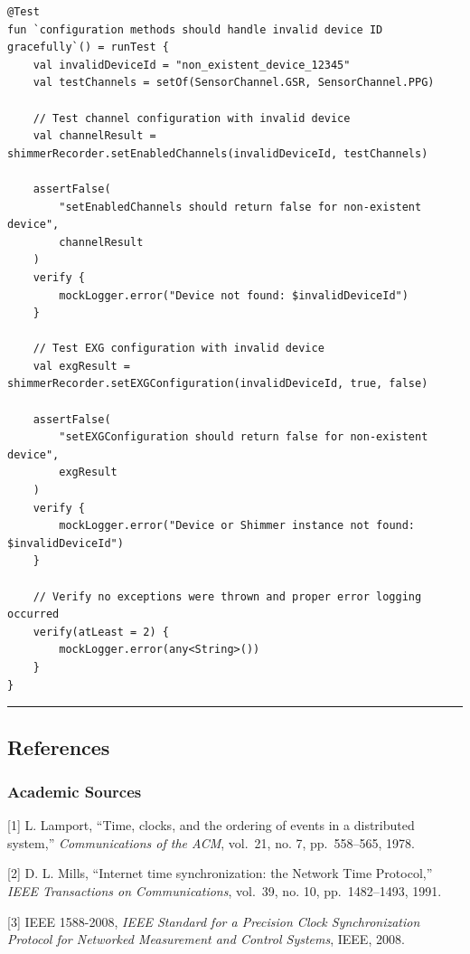 \documentclass[12pt,a4paper]{article}
\begin{document}
\begin{lstlisting}
@Test
fun `configuration methods should handle invalid device ID gracefully`() = runTest {
    val invalidDeviceId = "non_existent_device_12345"
    val testChannels = setOf(SensorChannel.GSR, SensorChannel.PPG)

    // Test channel configuration with invalid device
    val channelResult = shimmerRecorder.setEnabledChannels(invalidDeviceId, testChannels)
    
    assertFalse(
        "setEnabledChannels should return false for non-existent device", 
        channelResult
    )
    verify { 
        mockLogger.error("Device not found: $invalidDeviceId") 
    }

    // Test EXG configuration with invalid device  
    val exgResult = shimmerRecorder.setEXGConfiguration(invalidDeviceId, true, false)
    
    assertFalse(
        "setEXGConfiguration should return false for non-existent device",
        exgResult
    )
    verify { 
        mockLogger.error("Device or Shimmer instance not found: $invalidDeviceId") 
    }

    // Verify no exceptions were thrown and proper error logging occurred
    verify(atLeast = 2) { 
        mockLogger.error(any<String>()) 
    }
}
\end{lstlisting}

\begin{center}\rule{0.5\linewidth}{0.5pt}\end{center}

\subsection{References}\label{references-1}

\subsubsection{Academic Sources}\label{academic-sources}

{[}1{]} L. Lamport, ``Time, clocks, and the ordering of events in a distributed system,'' \emph{Communications of the ACM}, vol.~21, no. 7, pp.~558--565, 1978.

{[}2{]} D. L. Mills, ``Internet time synchronization: the Network Time Protocol,'' \emph{IEEE Transactions on Communications}, vol.~39, no. 10, pp.~1482--1493, 1991.

{[}3{]} IEEE 1588-2008, \emph{IEEE Standard for a Precision Clock Synchronization Protocol for Networked Measurement and Control Systems}, IEEE, 2008.
\end{document}
